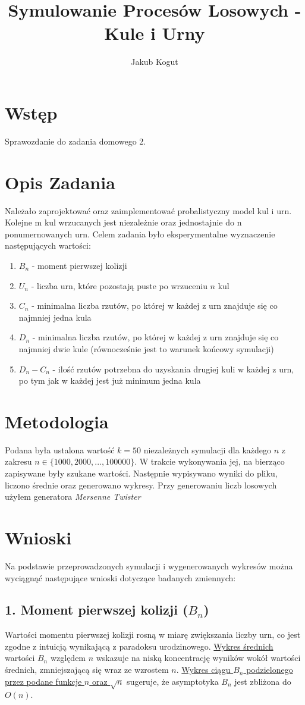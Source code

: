 \documentclass{article}
\title{Symulowanie Procesów Losowych - Kule i Urny}
\author{Jakub Kogut}
\date{}
\begin{document}
\maketitle

\section{Wstęp}
Sprawozdanie do zadania domowego 2.
\section{Opis Zadania}
Należało zaprojektować oraz zaimplementować probalistyczny model kul i urn. Kolejne m kul wrzucanych jest niezależnie oraz jednostajnie do n ponumernowanych urn. Celem zadania było eksperymentalne wyznaczenie następujących wartości:
\begin{enumerate}
    \item $B_n$ - moment pierwszej kolizji
    \item $U_n$ - liczba urn, które pozostają puste po wrzuceniu $n$ kul
    \item $C_n$ - minimalna liczba rzutów, po której w każdej z urn znajduje się co najmniej jedna kula
    \item $D_n$ - minimalna liczba rzutów, po której w każdej z urn znajduje się co najmniej dwie kule (równocześnie jest to warunek końcowy symulacji)
    \item $D_n - C_n$ - ilość rzutów potrzebna do uzyskania drugiej kuli w każdej z urn, po tym jak w każdej jest już minimum jedna kula
\end{enumerate}
\section{Metodologia}
Podana była ustalona wartość $k=50$ niezależnych symulacji dla każdego $n$ z zakresu $n \in \{1000, 2000, ..., 100000\}$. W trakcie wykonywania jej, na bierząco zapisywane były szukane wartości. Następnie wypisywano wyniki do pliku, liczono średnie oraz generowano wykresy.\newline
Przy generowaniu liczb losowych użyłem generatora \textit{Mersenne Twister}
\section{Wnioski}
Na podstawie przeprowadzonych symulacji i wygenerowanych wykresów można wyciągnąć następujące wnioski dotyczące badanych zmiennych:

\subsection*{1. Moment pierwszej kolizji ($B_n$)}
Wartości momentu pierwszej kolizji rosną w miarę zwiększania liczby urn, co jest zgodne z intuicją wynikającą z paradoksu urodzinowego. \hyperref[fig:WykresBn]{Wykres średnich} wartości $B_n$ względem $n$ wskazuje na niską koncentrację wyników wokół wartości średnich, zmniejszającą się wraz ze wzrostem $n$. \newline
\hyperref[fig:WykresBnratio]{Wykres ciągu $B_n$ podzielonego przez podane funkcje $n$ oraz $\sqrt{n}$} sugeruje, że asymptotyka $B_n$ jest zbliżona do $O(n)$.
\end{document}
